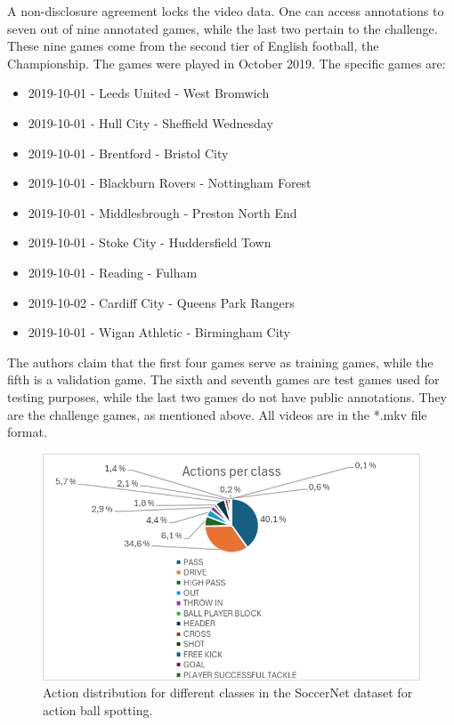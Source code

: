 A non-disclosure agreement locks the video data. One can access annotations to seven out of nine annotated games, while the last two pertain to the challenge. These nine games come from the second tier of English football, the Championship. The games were played in October 2019. The specific games are:

\begin{itemize}
    \item 2019-10-01 - Leeds United - West Bromwich
    \item 2019-10-01 - Hull City - Sheffield Wednesday
    \item 2019-10-01 - Brentford - Bristol City
    \item 2019-10-01 - Blackburn Rovers - Nottingham Forest
    \item 2019-10-01 - Middlesbrough - Preston North End
    \item 2019-10-01 - Stoke City - Huddersfield Town
    \item 2019-10-01 - Reading - Fulham
    \item 2019-10-02 - Cardiff City - Queens Park Rangers
    \item 2019-10-01 - Wigan Athletic - Birmingham City
\end{itemize}

The authors claim that the first four games serve as training games, while the fifth is a validation game. The sixth and seventh games are test games used for testing purposes, while the last two games do not have public annotations. They are the challenge games, as mentioned above. All videos are in the *.mkv file format. 

\begin{figure}
    \centering
    \includegraphics[width=1\linewidth]{figures/actions_per_class_2.png}
    \caption{Action distribution for different classes in the SoccerNet dataset for action ball spotting. }
    \label{fig:soccernet_dist}
\end{figure}

